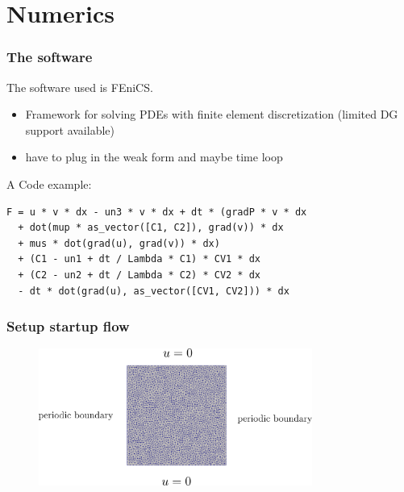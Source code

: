 \documentclass[12pt,a4paper,handout]{beamer}
\theoremstyle{definition}
\theoremstyle{plain}
\begin{document}
\section{Numerics}
\begin{frame}[fragile]
    \frametitle{The software}
    The software used is FEniCS. 
    \begin{itemize}[<+->]
        \item Framework for solving PDEs with finite element discretization (limited DG support available)
        \item have to plug in the weak form and maybe time loop
    \end{itemize}
A Code example:
\begin{verbatim}
F = u * v * dx - un3 * v * dx + dt * (gradP * v * dx 
  + dot(mup * as_vector([C1, C2]), grad(v)) * dx 
  + mus * dot(grad(u), grad(v)) * dx) 
  + (C1 - un1 + dt / Lambda * C1) * CV1 * dx 
  + (C2 - un2 + dt / Lambda * C2) * CV2 * dx 
  - dt * dot(grad(u), as_vector([CV1, CV2])) * dx
\end{verbatim}
\end{frame}
\begin{frame}
    \frametitle{Setup startup flow}
    
    \begin{figure}
        \includegraphics[width=0.8\textwidth]{setupsquare}
    \end{figure}
\end{frame}
\end{document}

